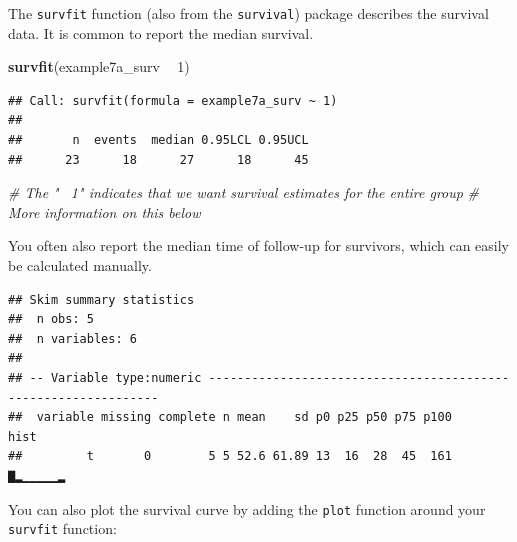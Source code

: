 \documentclass[]{book}
\newenvironment{Shaded}{\begin{snugshade}}{\end{snugshade}}
\newcommand{\CommentTok}[1]{\textcolor[rgb]{0.56,0.35,0.01}{\textit{#1}}}
\newcommand{\DecValTok}[1]{\textcolor[rgb]{0.00,0.00,0.81}{#1}}
\newcommand{\KeywordTok}[1]{\textcolor[rgb]{0.13,0.29,0.53}{\textbf{#1}}}
\newcommand{\NormalTok}[1]{#1}
\newcommand{\OperatorTok}[1]{\textcolor[rgb]{0.81,0.36,0.00}{\textbf{#1}}}
\newcommand{\StringTok}[1]{\textcolor[rgb]{0.31,0.60,0.02}{#1}}
\begin{document}
The \texttt{survfit} function (also from the \texttt{survival}) package describes the survival data. It is common to report the median survival.

\begin{Shaded}
\begin{Highlighting}[]
\KeywordTok{survfit}\NormalTok{(example7a_surv }\OperatorTok{~}\StringTok{ }\DecValTok{1}\NormalTok{)}
\end{Highlighting}
\end{Shaded}

\begin{verbatim}
## Call: survfit(formula = example7a_surv ~ 1)
## 
##       n  events  median 0.95LCL 0.95UCL 
##      23      18      27      18      45
\end{verbatim}

\begin{Shaded}
\begin{Highlighting}[]
\CommentTok{# The "~ 1" indicates that we want survival estimates for the entire group}
\CommentTok{# More information on this below}
\end{Highlighting}
\end{Shaded}

You often also report the median time of follow-up for survivors, which can easily be calculated manually.

\begin{Shaded}
\end{Shaded}

\begin{verbatim}
## Skim summary statistics
##  n obs: 5 
##  n variables: 6 
## 
## -- Variable type:numeric ---------------------------------------------------------------
##  variable missing complete n mean    sd p0 p25 p50 p75 p100     hist
##         t       0        5 5 52.6 61.89 13  16  28  45  161 ▇▂▁▁▁▁▁▂
\end{verbatim}

You can also plot the survival curve by adding the \texttt{plot} function around your \texttt{survfit} function:
\end{document}
